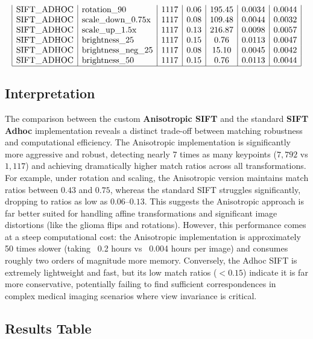 \documentclass[conference]{IEEEtran}
\begin{document}
$$\begin{array}{|l|l|c|c|c|c|c|}
\text{SIFT\_ADHOC} & \text{rotation\_90} & 1117 & 0.06 & 195.45 & 0.0034 & 0.0044 \\
\text{SIFT\_ADHOC} & \text{scale\_down\_0.75x} & 1117 & 0.08 & 109.48 & 0.0044 & 0.0032 \\
\text{SIFT\_ADHOC} & \text{scale\_up\_1.5x} & 1117 & 0.13 & 216.87 & 0.0098 & 0.0057 \\
\text{SIFT\_ADHOC} & \text{brightness\_25} & 1117 & 0.15 & 0.76 & 0.0113 & 0.0047 \\
\text{SIFT\_ADHOC} & \text{brightness\_neg\_25} & 1117 & 0.08 & 15.10 & 0.0045 & 0.0042 \\
\text{SIFT\_ADHOC} & \text{brightness\_50} & 1117 & 0.15 & 0.76 & 0.0113 & 0.0044 \\ \hline
\end{array}$$



\subsection*{Interpretation}

The comparison between the custom \textbf{Anisotropic SIFT} and the standard \textbf{SIFT Adhoc} implementation reveals a distinct trade-off between matching robustness and computational efficiency. The Anisotropic implementation is significantly more aggressive and robust, detecting nearly 7 times as many keypoints ($7,792$ vs $1,117$) and achieving dramatically higher match ratios across all transformations. For example, under rotation and scaling, the Anisotropic version maintains match ratios between $0.43$ and $0.75$, whereas the standard SIFT struggles significantly, dropping to ratios as low as $0.06$–$0.13$. This suggests the Anisotropic approach is far better suited for handling affine transformations and significant image distortions (like the glioma flips and rotations). However, this performance comes at a steep computational cost: the Anisotropic implementation is approximately 50 times slower (taking ~0.2 hours vs ~0.004 hours per image) and consumes roughly two orders of magnitude more memory. Conversely, the Adhoc SIFT is extremely lightweight and fast, but its low match ratios ($<0.15$) indicate it is far more conservative, potentially failing to find sufficient correspondences in complex medical imaging scenarios where view invariance is critical.



\subsection*{Results Table}
\end{document}
